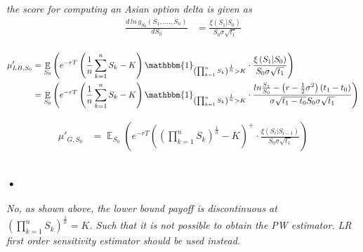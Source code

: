 \documentclass[10pt,oneside,a4paper]{article}
\DeclareMathOperator{\E}{\mathbb{E}}
\begin{document}
\begin{flushleft}
\textsl{the score for computing an Asian option delta is given as}
\begin{align*}
\frac{d \, ln \, g_{S_{0}} (S_1, ...., S_n)}{d S_0} &= \frac{\xi\left(S_1|S_{0}\right)}{S_0 \sigma \sqrt{t_1}}\\
\end{align*}

\begin{align*}
\mu'_{LB, S_0} &= \E _{S_0}\left(e^{-rT}\left( \frac{1}{n}\sum_{k=1}^{n}S_k - K\right)\mathbbm{1}_{\left( \prod_{k=1}^{n}S_k\right) ^{\frac{1}{n} }>K} \cdot \frac{\xi\left(S_1|S_{0}\right)}{S_0 \sigma \sqrt{t_1}} \right)\\
&= \E _{S_0}\left(e^{-rT}\left( \frac{1}{n}\sum_{k=1}^{n}S_k - K\right)\mathbbm{1}_{\left( \prod_{k=1}^{n}S_k\right) ^{\frac{1}{n} }>K} \cdot \frac{ln\frac{S_1}{S_0} - \left(r - \frac{1}{2}\sigma^2\right)\left(t_1 - t_0\right)}{\sigma\sqrt{t_1 - t_0}S_0\sigma\sqrt{t_1}}\right)
\end{align*}

\vspace{5mm}

\begin{align*}
\mu'_{G, S_0} &= \E _{S_0}\left(e^{-rT}\left(\left(\prod_{k=1}^{n}S_k\right) ^{\frac{1}{n}} - K\right)^{+} \cdot \frac{\xi\left(S_i|S_{i-1}\right)}{S_0 \sigma \sqrt{t_1}} \right)\\
\end{align*}
\subsubsection{•}
\textsl{No, as shown above, the lower bound payoff is discontinuous at $\left( \prod_{k=1}^{n}S_k\right) ^{\frac{1}{n}} =K$. Such that it is not possible to obtain the PW estimator. LR first order sensitivity estimator should be used instead.}


\end{flushleft}
\end{document}
